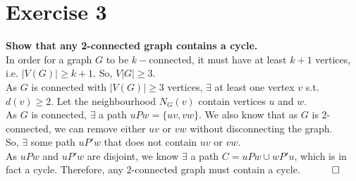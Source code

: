 \section*{Exercise 3}
\textbf{Show that any 2-connected graph contains a cycle.} \\
\linebreak
In order for a graph $G$ to be $k-$connected, it must have at least $k+1$ vertices, i.e. $|V(G)| \geq k+1$. So, $V|G| \geq 3$. \\
\linebreak
As $G$ is connected with $|V(G)| \geq 3$ vertices, $\exists$ at least one vertex $v$ s.t. $d(v) \geq 2$. Let the neighbourhood $N_G(v)$ contain vertices $u$ and $w$. \\
\linebreak 
As $G$ is connected, $\exists$ a path $uPw = \{uv, vw\}$. We also know that as $G$ is 2-connected, we can remove either $uv$ or $vw$ without disconnecting the graph. \\
\linebreak 
So, $\exists$ some path $uP'w$ that does not contain $uv$ or $vw$. \\
\linebreak 
As $uPw$ and $uP'w$ are disjoint, we know $\exists$ a path $C = uPw \cup wP'u$, which is in fact a cycle. Therefore, any 2-connected graph must contain a cycle. 
$\hspace{10mm} \square$
